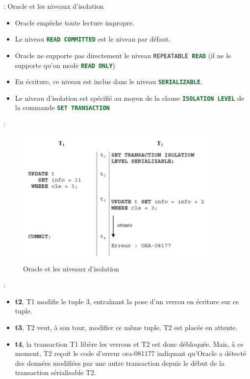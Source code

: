 \documentclass[10pt]{beamer}
\begin{document}
\begin{frame}{\secname : \subsecname}
    Oracle et les niveaux d'isolation
    \begin{itemize}
        \item Oracle empêche toute lecture impropre.
        \item Le niveau \lstinline[language=sql]!READ COMMITTED! est le niveau par défaut.
        \item Oracle ne supporte pas directement le niveau \lstinline[language=sql]!REPEATABLE READ! (il ne le supporte qu'on mode \lstinline[language=sql]!READ ONLY!)
        \item En écriture, ce niveau est inclus dans le niveau \lstinline[language=sql]!SERIALIZABLE!.
        \item Le niveau d'isolation est spécifié au moyen de la clause \lstinline[language=sql]!ISOLATION LEVEL! de la commande \lstinline[language=sql]!SET TRANSACTION!
    \end{itemize}
\end{frame}

\begin{frame}{\secname : \subsecname}
    \begin{figure}
        \begin{center}
            \includegraphics[width=0.9\textwidth]{../assets/img/coherence-de-lecture-4.pdf}
            \caption{Oracle et les niveaux d'isolation}
        \end{center}
    \end{figure}
\end{frame}
\begin{frame}{\secname : \subsecname}
    \begin{itemize}
        \item \textbf{t2}, T1 modifie le tuple 3, entraînant la pose d'un verrou en écriture sur ce tuple.
        \item \textbf{t3}, T2 veut, à son tour, modifier ce même tuple, T2 est placée en attente.
        \item \textbf{t4}, la transaction T1 libère les verrous et T2 est donc débloquée. Mais, à ce moment, T2 reçoit le code d'erreur ora-081177 indiquant qu'Oracle a détecté des données modifiées par une autre transaction depuis le début de la transaction sérialisable T2.
    \end{itemize}
\end{frame}
\end{document}
